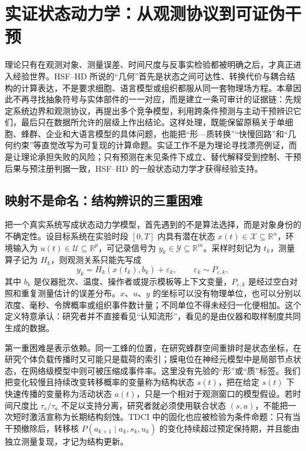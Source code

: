 \chapter{实证状态动力学：从观测协议到可证伪干预}
\label{chp:empirical_geometric_dynamics}

理论只有在观测对象、测量误差、时间尺度与反事实检验都被明确之后，才真正进入经验世界。HSF--HD 所说的“几何”首先是状态之间可达性、转换代价与耦合结构的计算表达，不是要求细胞、语言模型或组织都服从同一套物理场方程。本章因此不再寻找抽象符号与实体部件的一一对应，而是建立一条可审计的证据链：先规定系统边界和观测协议，再提出多个竞争模型，利用跨条件预测与主动干预辨识它们，最后只在数据所允许的层级上作出结论。这样处理，既能保留原稿关于单细胞、蜂群、企业和大语言模型的具体问题，也能把“形—质转换”“快慢回路”和“几何约束”等直觉改写为可复现的计算命题。实证工作不是为理论寻找漂亮例证，而是让理论承担失败的风险；只有预测在未见条件下成立、替代解释受到控制、干预后果与预注册判据一致，HSF--HD 的一般状态动力学才获得经验支持。

\section{映射不是命名：结构辨识的三重困难}
\label{sec:structural_mapping_abyss}

把一个真实系统写成状态动力学模型，首先遇到的不是算法选择，而是对象身份的不确定性。设目标系统在实验时段 $[0,T]$ 内具有潜在状态 $x(t)\in\mathcal X\subseteq\mathbb R^n$，环境输入为 $u(t)\in\mathcal U\subseteq\mathbb R^p$，可记录信号为 $y_k\in\mathcal Y\subseteq\mathbb R^m$。采样时刻记为 $t_k$，测量算子记为 $H_k$，则观测关系只能先写成
\begin{equation}
 y_k=H_k\!\left(x(t_k),b_k\right)+\varepsilon_k,
 \qquad \varepsilon_k\sim P_{\varepsilon,k},
\end{equation}
其中 $b_k$ 是仪器批次、温度、操作者或提示模板等上下文变量，$P_{\varepsilon,k}$ 是经过空白对照和重复测量估计的误差分布。$x$、$u$、$y$ 的坐标可以没有物理单位，也可以分别以浓度、毫秒、令牌概率或组织事件数计量；不同单位不得未经归一化便相加。这个定义特意承认：研究者并不直接看见“认知流形”，看见的是由仪器和取样制度共同生成的数据。

第一重困难是表示依赖。同一工蜂的位置，在研究蜂群空间重排时是状态坐标，在研究个体负载传播时又可能只是载荷的索引；膜电位在神经元模型中是局部节点状态，在网络级模型中则可被压缩成事件率。这里没有先验的“形”或“质”标签。我们把变化较慢且持续改变转移概率的变量称为结构状态 $s(t)$，把在给定 $s(t)$ 下快速传播的变量称为活动状态 $a(t)$，只是一个相对于观测窗口的模型假设。若时间尺度比 $\tau_s/\tau_a$ 不足以支持分离，研究者就必须使用联合状态 $(s,a)$，不能把一次短时激活宣称为长期结构刻蚀。TDCI 中的固化也应被检验为条件命题：只有当干预撤除后，转移核 $P(a_{k+1}\mid a_k,s_k,u_k)$ 的变化持续超过预定保持期，并且能由独立测量复现，才记为结构更新。

